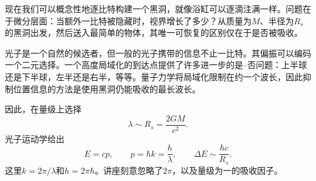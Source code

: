 现在我们可以概念性地逐比特构建一个黑洞，就像浴缸可以逐滴注满一样。问题在于微分层面：当额外一比特被隐藏时，视界增长了多少？从质量为\(M\)、半径为\(R_s\)的黑洞出发，然后送入最简单的物体，其唯一可恢复的区别仅在于是否被吸收。

\begin{classroomqa}
\end{classroomqa}

光子是一个自然的候选者，但一般的光子携带的信息不止一比特。其偏振可以编码一个二元选择。一个高度局域化的到达点提供了许多进一步的是--否问题：上半球还是下半球，左半还是右半，等等。量子力学将局域化限制在约一个波长，因此抑制位置信息的方法是使用黑洞仍能吸收的最长波长。

\begin{classroomqa}
\end{classroomqa}

\begin{classroomqa}
\end{classroomqa}

因此，在量级上选择
\begin{equation}
\lambda\sim R_s=\frac{2GM}{c^2}.
\label{eq:one-bit-wave}
\end{equation}
光子运动学给出
\begin{equation}
E=cp,
\qquad
p=\hbar k=\frac{h}{\lambda},
\qquad
\Delta E\sim\frac{\hbar c}{R_s}.
\label{eq:one-bit-energy}
\end{equation}
这里\(k=2\pi/\lambda\)和\(h=2\pi\hbar\)。讲座刻意忽略了\(2\pi\)，以及量级为一的吸收因子。

\begin{classroomqa}
\end{classroomqa}

